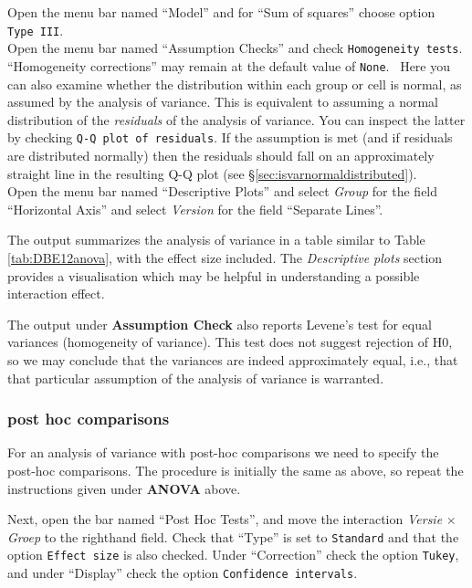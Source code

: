 \documentclass[
]{book}
\begin{document}
Open the menu bar named ``Model'' and for ``Sum of squares'' choose option \texttt{Type\ III}.\\
Open the menu bar named ``Assumption Checks'' and check \texttt{Homogeneity\ tests}.\\
``Homogeneity corrections'' may remain at the default value of \texttt{None}.~
Here you can also examine whether the distribution within each group or cell is normal, as assumed by the analysis of variance. This is equivalent to assuming a normal distribution of the \emph{residuals} of the analysis of variance. You can inspect the latter by checking \texttt{Q-Q\ plot\ of\ residuals}. If the assumption is met (and if residuals are distributed normally) then the residuals should fall on an approximately straight line in the resulting Q-Q plot (see §\ref{sec:isvarnormaldistributed}).\\
Open the menu bar named ``Descriptive Plots'' and select \emph{Group} for the field ``Horizontal Axis'' and select \emph{Version} for the field ``Separate Lines''.

The output summarizes the analysis of variance in a table similar to Table \ref{tab:DBE12anova}, with the effect size included.
The \emph{Descriptive plots} section provides a visualisation which may be helpful in understanding a possible interaction effect.

The output under \textbf{Assumption Check} also reports Levene's test for equal variances (homogeneity of variance). This test does not suggest rejection of H0, so we may conclude that the variances are indeed approximately equal, i.e., that that particular assumption of the analysis of variance is warranted.

\hypertarget{post-hoc-comparisons-1}{%
\subsubsection{post hoc comparisons}\label{post-hoc-comparisons-1}}

For an analysis of variance with post-hoc comparisons we need to specify the post-hoc comparisons. The procedure is initially the same as above, so repeat the instructions given under \textbf{ANOVA} above.

Next, open the bar named ``Post Hoc Tests'', and move the interaction \emph{Versie} \(\times\) \emph{Groep} to the righthand field.
Check that ``Type'' is set to \texttt{Standard} and that the option \texttt{Effect\ size} is also checked.
Under ``Correction'' check the option \texttt{Tukey}, and under ``Display'' check the option \texttt{Confidence\ intervals}.
\end{document}
